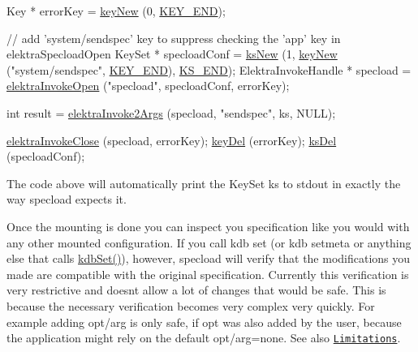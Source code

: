 \begin{DoxyCode}
Key * errorKey = \hyperlink{group__key_gad23c65b44bf48d773759e1f9a4d43b89}{keyNew} (0, \hyperlink{group__key_gga91fb3178848bd682000958089abbaf40aa8adb6fcb92dec58fb19410eacfdd403}{KEY\_END});

\textcolor{comment}{// add 'system/sendspec' key to suppress checking the 'app' key in elektraSpecloadOpen}
KeySet * specloadConf = \hyperlink{group__keyset_ga671e1aaee3ae9dc13b4834a4ddbd2c3c}{ksNew} (1, \hyperlink{group__key_gad23c65b44bf48d773759e1f9a4d43b89}{keyNew} (\textcolor{stringliteral}{"system/sendspec"}, \hyperlink{group__key_gga91fb3178848bd682000958089abbaf40aa8adb6fcb92dec58fb19410eacfdd403}{KEY\_END}), 
      \hyperlink{kdbenum_8c_a7a28fce3773b2c873c94ac80b8b4cd54}{KS\_END});
ElektraInvokeHandle * specload = \hyperlink{group__invoke_ga3eb20131e9a8fc9a6cebf126927c09bc}{elektraInvokeOpen} (\textcolor{stringliteral}{"specload"}, specloadConf, errorKey);

\textcolor{keywordtype}{int} result = \hyperlink{group__invoke_gaa257d93399c60f73c611205bbfa7c9a0}{elektraInvoke2Args} (specload, \textcolor{stringliteral}{"sendspec"}, ks, NULL);

\hyperlink{group__invoke_ga684a21daa0b3c20783c55184a9157b3b}{elektraInvokeClose} (specload, errorKey);
\hyperlink{group__key_ga3df95bbc2494e3e6703ece5639be5bb1}{keyDel} (errorKey);
\hyperlink{group__keyset_ga27e5c16473b02a422238c8d970db7ac8}{ksDel} (specloadConf);
\end{DoxyCode}


The code above will automatically print the Key\+Set {\ttfamily ks} to stdout in exactly the way {\ttfamily specload} expects it.

Once the mounting is done you can inspect you specification like you would with any other mounted configuration. If you call {\ttfamily kdb set} (or {\ttfamily kdb setmeta} or anything else that calls {\ttfamily \hyperlink{group__kdb_ga11436b058408f83d303ca5e996832bcf}{kdb\+Set()}}), however, {\ttfamily specload} will verify that the modifications you made are compatible with the original specification. Currently this verification is very restrictive and doesn\textquotesingle{}t allow a lot of changes that would be safe. This is because the necessary verification becomes very complex very quickly. For example adding {\ttfamily opt/arg} is only safe, if {\ttfamily opt} was also added by the user, because the application might rely on the default {\ttfamily opt/arg=none}. See also \href{#limitations}{\tt Limitations}.

